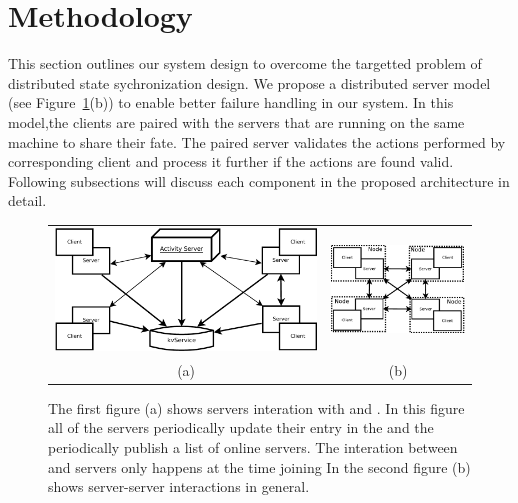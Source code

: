 
\section{Methodology}
\label{sec:methodology}

	This section outlines our system design to overcome the targetted problem of distributed state sychronization design. We propose a distributed server model (see Figure~\ref{figure:server-models}(b)) to enable better failure handling in our system. In this model,the clients are paired with the servers that are running on the same machine to share their fate. The paired server validates the actions performed by corresponding client and process it further if the actions are found valid. Following subsections will discuss each component in the proposed architecture in detail.

\begin{figure}[ht]
	\centering
	\begin{tabular}{c c}
		
		\includegraphics[width=0.52\linewidth]{../images/client-distributed-server-model-Activity1-crop.pdf} &
		\includegraphics[width=0.40\linewidth]{../images/client-distributed-server-model-crop.pdf} \\
		(a) & (b)
	\end{tabular}
	
	\caption{\label{figure:server-models} The first figure (a) shows servers interation with \activityServer and \kvService. In this figure all of the servers periodically update their entry in the \kvService and the \activityServer periodically publish a list of online servers. The interation between \activityServer and servers only happens at the time joining In the second figure (b) shows server-server interactions in general.}
\end{figure}


